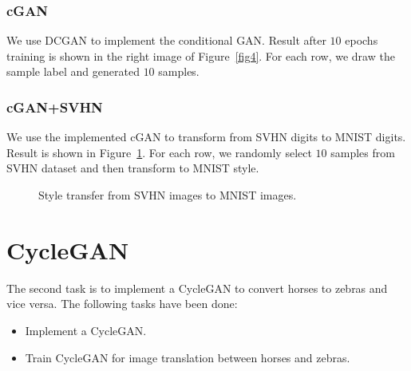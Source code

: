 \documentclass[runningheads]{llncs}
\begin{document}
\subsubsection{cGAN} We use DCGAN to implement the conditional GAN. Result after $10$ epochs training is shown in the right image of Figure~\ref{fig4}. For each row, we draw the sample label and generated $10$ samples.

\subsubsection{cGAN+SVHN} We use the implemented cGAN to transform from SVHN digits to MNIST digits. Result is shown in Figure~\ref{fig5}. For each row, we randomly select $10$ samples from SVHN dataset and then transform to MNIST style.
\begin{figure}[ht]
	\centering
	\setlength{\fboxrule}{0.0pt}
	\caption{Style transfer from SVHN images to MNIST images.}
	\label{fig5}
\end{figure}




\section{CycleGAN}
The second task is to implement a CycleGAN to convert horses to zebras and vice versa. The following tasks have been done:
\begin{itemize}
	\item Implement a CycleGAN.
	\item Train CycleGAN for image translation between horses and zebras.
\end{itemize}
\end{document}
